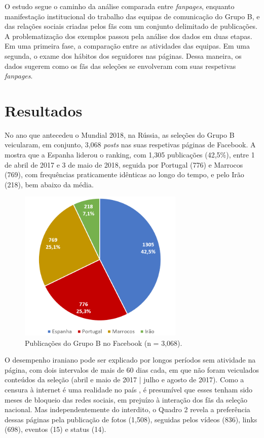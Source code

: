 \documentclass{textolivre}
\begin{document}
O estudo segue o caminho da análise comparada entre \emph{fanpages}, enquanto manifestação institucional do trabalho das equipas de comunicação do Grupo B, e das relações sociais criadas pelos fãs com um conjunto delimitado de publicações. A problematização dos exemplos passou pela análise dos dados em duas etapas. Em uma primeira fase, a comparação entre as atividades das equipas. Em uma segunda, o exame dos hábitos dos seguidores nas páginas. Dessa maneira, os dados sugerem como os fãs das seleções se envolveram com suas respetivas \emph{fanpages}.

\section{Resultados}\label{sec-resultados}
No ano que antecedeu o Mundial 2018, na Rússia, as seleções do Grupo B veicularam, em conjunto, 3,068 \emph{posts} nas suas respetivas páginas de Facebook. A  mostra que a Espanha liderou o ranking, com 1,305 publicações (42,5\%), entre 1 de abril de 2017 e 3 de maio de 2018, seguida por Portugal (776) e Marrocos (769), com frequências praticamente idênticas ao longo do tempo, e pelo Irão (218), bem abaixo da média.

\begin{figure}[htbp]
 \centering
 \includegraphics[width=0.7\textwidth]{figure01.png}
 \caption{Publicações do Grupo B no Facebook (n = 3,068).}
 \label{fig1}
\end{figure}

O desempenho iraniano pode ser explicado por longos períodos sem atividade na página, com dois intervalos de mais de 60 dias cada, em que não foram veiculados conteúdos da seleção (abril e maio de 2017 | julho e agosto de 2017). Como a censura à internet é uma realidade no país \cite{sreberny2010}, é presumível que esses tenham sido meses de bloqueio das redes sociais, em prejuízo à interação dos fãs da seleção nacional. Mas independentemente do interdito, o Quadro 2 revela a preferência dessas páginas pela publicação de fotos (1,508), seguidas pelos vídeos (836), links (698), eventos (15) e status (14).
\end{document}
